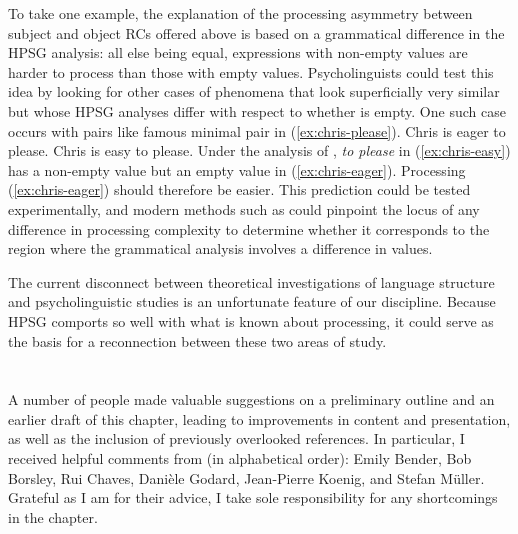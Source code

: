 \documentclass[output=paper,biblatex,babelshorthands,newtxmath,draftmode,colorlinks,citecolor=brown]{langscibook}
\begin{document}
To take one example, the explanation of the processing asymmetry between subject and object RCs
offered above is based on a grammatical difference in the HPSG analysis:  all else being equal,
expressions with non-empty \slasch{} values are harder to process than those with empty \slasch
values.  Psycholinguists could test this idea by looking for other cases of phenomena that look
superficially very similar but whose HPSG analyses differ with respect to whether \slasch is empty.
One such case occurs with pairs like  famous minimal pair in
(\ref{ex:chris-please}). 
\eal\label{ex:chris-please}
\ex Chris is eager to please.\label{ex:chris-eager}
\ex Chris is easy to please.\label{ex:chris-easy}
\zl
Under the analysis of \citet[Section~4.3]{ps2}, \emph{to please} in (\ref{ex:chris-easy}) has a non-empty
\slasch{} value but an empty \slasch value in (\ref{ex:chris-eager}).  Processing
(\ref{ex:chris-eager}) should therefore be easier.  This prediction could be tested experimentally,
and modern methods such as  could pinpoint the locus of any difference in
processing complexity to determine whether it corresponds to the region where the grammatical
analysis involves a difference in \slasch{} values. 

The current disconnect between theoretical investigations of language structure and psycholinguistic
studies is an unfortunate feature of our discipline.  Because HPSG comports so well with what is
known about processing, it could serve as the basis for a reconnection between these two areas of
study. 

\section*{\acknowledgmentsUS}

A number of people made valuable suggestions on a preliminary outline and an earlier draft of this
chapter, leading to improvements in content and presentation, as well as the inclusion of previously
overlooked references.  In particular, I received helpful comments from (in alphabetical order):
Emily Bender, Bob Borsley, Rui Chaves, Danièle Godard, Jean-Pierre Koenig, and Stefan Müller.
Grateful as I am for their advice, I take sole responsibility for any shortcomings in the chapter. 

{\sloppy
\printbibliography[heading=subbibliography,notkeyword=this] 
}
\end{document}
